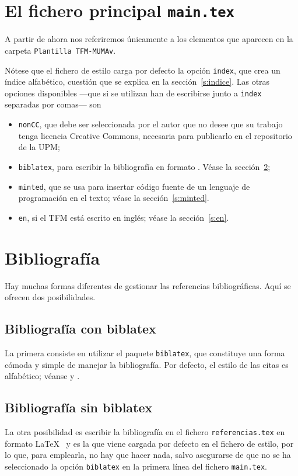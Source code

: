 \section{El fichero principal \texttt{main.tex}}

A partir de ahora nos referiremos únicamente a los elementos que aparecen  en la carpeta \texttt{Plantilla TFM-MUMAv}. 

Nótese que el fichero de estilo carga por defecto la opción \texttt{index}, que crea un índice alfabético, cuestión que se explica en la sección~\ref{s:indice}. Las otras opciones disponibles ---que si se utilizan han de escribirse junto a \texttt{index} separadas por comas--- son
\begin{itemize}
    \item \texttt{nonCC}, que debe ser seleccionada por el autor que no desee que su trabajo tenga licencia Creative Commons, necesaria para publicarlo en el repositorio de la UPM;
    \item \texttt{biblatex}, para escribir la bibliografía en formato . Véase la sección~\ref{s:referencias-bibliograficas};
    \item \texttt{minted}, que se usa para insertar código fuente de un lenguaje de programación en el texto; véase la sección~\ref{s:minted}.
    \item \texttt{en}, si el TFM está escrito en inglés; véase la sección~\ref{s:en}.
\end{itemize} 

\section{Bibliografía}
\label{s:referencias-bibliograficas}

Hay muchas formas diferentes de gestionar las referencias bibliográficas. Aquí se ofrecen dos posibilidades.

\subsection{Bibliografía con {\ttfamily biblatex}}
La primera consiste en utilizar el paquete \texttt{biblatex}, que constituye una forma cómoda y simple de manejar la bibliografía. Por defecto, el estilo de las citas es alfabético; véanse \cite{wiles95} y \cite{berger88}.

\subsection{Bibliografía sin {\ttfamily biblatex}}
La otra posibilidad es escribir la bibliografía en el fichero \texttt{referencias.tex} en formato \LaTeX~  y es la que viene cargada por defecto en el fichero de estilo, por lo que, para emplearla, no hay que hacer nada, salvo asegurarse de que no se ha seleccionado la opción \texttt{biblatex} en la primera línea del fichero \texttt{main.tex}. 

